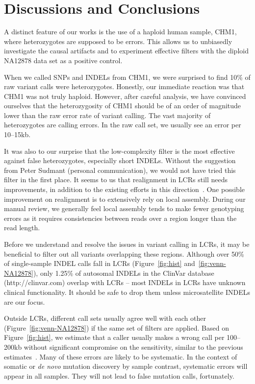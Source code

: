 \documentclass{bioinfo}
\begin{document}
\section{Discussions and Conclusions}
A distinct feature of our works is the use of a haploid human sample, CHM1,
where heterozygotes are supposed to be errors. This allows us to unbiasedly
investigate the causal artifacts and to experiment effective filters with the
diploid NA12878 data set as a positive control.

When we called SNPs and INDELs from CHM1, we were surprised to find 10\% of raw
variant calls were heterozygotes. Honestly, our immediate reaction was that
CHM1 was not truly haploid. However, after careful analysis, we have convinced
ourselves that the heterozygosity of CHM1 should be of an order of magnitude
lower than the raw error rate of variant calling. The vast majority of
heterozygotes are calling errors. In the raw call set, we usually see an error
per 10--15kb.

It was also to our surprise that the low-complexity filter is the most
effective against false heterozygotes, especially short INDELs. Without the
suggestion from Peter Sudmant (personal communication), we would not have tried
this filter in the first place. It seems to us that realignment in LCRs
still needs improvements, in addition to the existing efforts in this
direction~\citep{Homer:2010aa,Li:2011kx,Albers:2011aa}. One possible improvement on realignment is to extensively rely on
local assembly. During our manual review, we generally feel local assembly
tends to make fewer genotyping errors as it requires consistencies between
reads over a region longer than the read length.

Before we understand and resolve the issues in variant calling in LCRs,
it may be beneficial to filter out all variants overlapping these regions.
Although over 50\% of single-sample INDEL calls fall in LCRs
(Figure~\ref{fig:hist} and~\ref{fig:venn-NA12878}), only 1.25\% of autosomal
INDELs in the ClinVar database (http://clinvar.com) overlap with LCRs -- most
INDELs in LCRs have unknown clinical functionality. It should be safe to drop
them unless microsatellite INDELs are our focus.

Outside LCRs, different call sets usually agree well with each other
(Figure~\ref{fig:venn-NA12878}) if the same set of filters are applied. Based
on Figure~\ref{fig:hist}, we estimate that a caller usually makes a wrong call
per 100--200kb without significant compromise on the sensitivity, similar to
the previous estimates~\citep{Bentley:2008cr,Nickles:2012aa}. Many of these
errors are likely to be systematic. In the context of somatic or \emph{de novo}
mutation discovery by sample contrast, systematic errors will appear in all
samples.  They will not lead to false mutation calls, fortunately.
\end{document}
